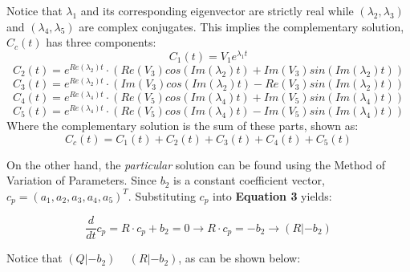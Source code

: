 \documentclass[a4paper, 12pt]{article}
\begin{document}
Notice that $\lambda_1$ and its corresponding eigenvector are strictly real while $(\lambda_2,\lambda_3)$ and $(\lambda_4,\lambda_5)$ are complex conjugates. This implies the complementary solution, $C_c(t)$ has three components:
\begin{equation}
C_1(t)=V_1e^{\lambda_1t}
\end{equation}
\begin{equation}
C_2(t)=e^{Re(\lambda_2)t}\cdot(Re(V_3)cos(Im(\lambda_2)t)+Im(V_3)sin(Im(\lambda_2)t))
\end{equation}
\begin{equation}
C_3(t)=e^{Re(\lambda_2)t}\cdot(Im(V_3)cos(Im(\lambda_2)t)-Re(V_3)sin(Im(\lambda_2)t))
\end{equation}
\begin{equation}
C_4(t)=e^{Re(\lambda_4)t}\cdot(Re(V_5)cos(Im(\lambda_4)t)+Im(V_5)sin(Im(\lambda_4)t))
\end{equation}
\begin{equation}
C_5(t)=e^{Re(\lambda_4)t}\cdot(Re(V_5)cos(Im(\lambda_4)t)-Im(V_5)sin(Im(\lambda_4)t))
\end{equation}
Where the complementary solution is the sum of these parts, shown as:
\begin{equation}
C_c(t)=C_1(t)+C_2(t)+C_3(t)+C_4(t)+C_5(t)
\end{equation}

On the other hand, the \textit{particular} solution can be found using the Method of Variation of Parameters. Since $b_2$ is a constant coefficient vector, $c_p=(a_1, a_2, a_3, a_4, a_5)^T$. Substituting $c_p$ into \textbf{Equation 3} yields:

\begin{equation}
\frac{d}{dt}c_p=R\cdot c_p+b_2=0\rightarrow R\cdot c_p=-b_2\rightarrow (R|-b_2)
\end{equation}

Notice that $(Q|-b_2)$ ~ $(R|-b_2)$, as can be shown below:
\end{document}

